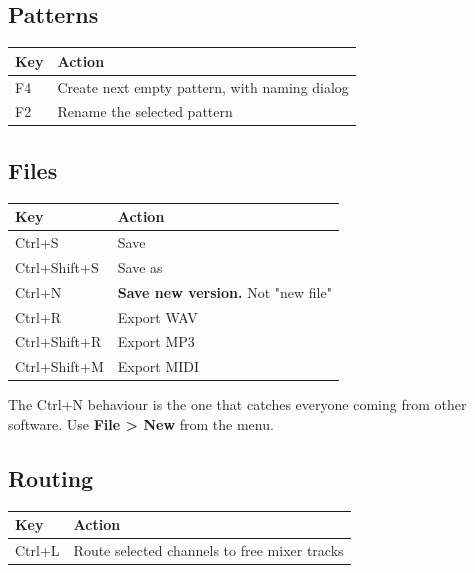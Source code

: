 \subsection{Patterns}\label{fl04_shortcuts-patterns}

{\def\LTcaptype{none} %
\begin{longtable}[]{@{}ll@{}}
\toprule\noalign{}
Key & Action \\
\midrule\noalign{}
\endhead
\bottomrule\noalign{}
\endlastfoot
F4 & Create next empty pattern, with naming dialog \\
F2 & Rename the selected pattern \\
\end{longtable}
}

\subsection{Files}\label{fl04_shortcuts-files}

{\def\LTcaptype{none} %
\begin{longtable}[]{@{}ll@{}}
\toprule\noalign{}
Key & Action \\
\midrule\noalign{}
\endhead
\bottomrule\noalign{}
\endlastfoot
Ctrl+S & Save \\
Ctrl+Shift+S & Save as \\
Ctrl+N & \textbf{Save new version.} Not "new file" \\
Ctrl+R & Export WAV \\
Ctrl+Shift+R & Export MP3 \\
Ctrl+Shift+M & Export MIDI \\
\end{longtable}
}

The Ctrl+N behaviour is the one that catches everyone coming from other software. Use
\textbf{File \textgreater{} New} from the menu.

\subsection{Routing}\label{fl04_shortcuts-routing}

{\def\LTcaptype{none} %
\begin{longtable}[]{@{}ll@{}}
\toprule\noalign{}
Key & Action \\
\midrule\noalign{}
\endhead
\bottomrule\noalign{}
\endlastfoot
Ctrl+L & Route selected channels to free mixer tracks \\
\end{longtable}
}

